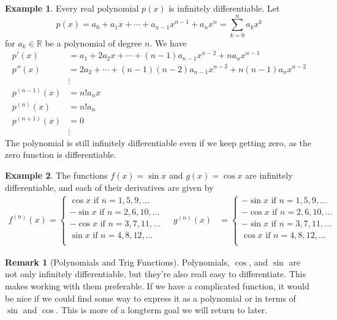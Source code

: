 \documentclass{article}
\newcommand{\R}{\mathbb{R}}
\theoremstyle{definition}
\newtheorem{example}{Example}[section]
\newtheorem{remark}{Remark}[section]
\begin{document}
	\begin{example}
		Every real polynomial $ p(x) $ is infinitely differentiable. Let 
		$$p(x)=a_0+a_1x+\cdots+a_{n-1}x^{n-1}+a_nx^n=\sum_{k=0}^{n}a_kx^k $$ for $ a_k\in\R $ be a polynomial of degree $ n $.
		We have \begin{align*}
			p'(x)&=a_1+2a_2x+\cdots+(n-1)a_{n-1}x^{n-2}+na_nx^{n-1}\\
			p''(x)&=2a_2+\cdots+(n-1)(n-2)a_{n-1}x^{n-3}+n(n-1)a_nx^{n-2}\\
			&\vdots\\
			p^{(n-1)}(x)&=n!a_nx\\
			p^{(n)}(x)&=n!a_n\\
			p^{(n+1)}(x)&=0\\
			&\vdots
		\end{align*} 
		The polynomial is still infinitely differentiable even if we keep getting zero, as the zero function is differentiable.
	\end{example}
	\begin{example}
		The functions $ f(x)=\sin x $ and  $g(x)=\cos x $ are infinitely differentiable, and each of their derivatives are given by 
		\begin{align*}
			f^{(n)}(x)=\begin{cases}
				\cos x \text{ if }n=1,5,9,\ldots\\
				-\sin x \text{ if }n=2,6,10,\ldots\\
				-\cos x \text{ if }n=3,7,11,\ldots\\
				\sin x \text{ if }n=4,8,12,\ldots\\
			\end{cases} \ \ \ \ \ 	g^{(n)}(x)&=\begin{cases}
				-\sin x \text{ if }n=1,5,9,\ldots\\
				-\cos x \text{ if }n=2,6,10,\ldots\\
				-\sin x \text{ if }n=3,7,11,\ldots\\
				\cos x \text{ if }n=4,8,12,\ldots\\
			\end{cases}
		\end{align*}
	\end{example}
	\begin{remark}[Polynomials and Trig Functions]
		Polynomials, $ \cos $, and $ \sin $ are not only infinitely differentiable, but they're also reall easy to differentiate. This makes working with them preferable. If we have a complicated function, it would be nice if we could find some way to express it as a polynomial or in terms of $ \sin $ and $ \cos $. This is more of a longterm goal we will return to later. 
	\end{remark}
\end{document}
